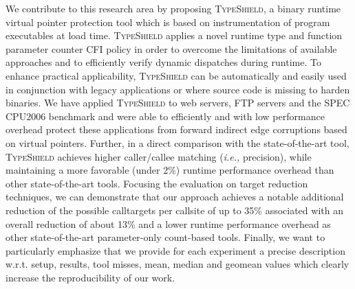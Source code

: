 We contribute to this research area by proposing \textsc{TypeShield}, a binary runtime virtual pointer protection tool 
which is based on instrumentation of program executables at load time. \textsc{TypeShield} applies a novel runtime 
type and function parameter counter CFI policy in order to overcome the limitations of available approaches and to 
efficiently verify dynamic dispatches during runtime. To enhance practical applicability, \textsc{TypeShield} can 
be automatically and easily used in conjunction with legacy applications or where source code is missing to harden 
binaries.
We have applied \textsc{TypeShield} to web servers, FTP servers and the SPEC CPU2006 benchmark and were able to 
efficiently and with low performance overhead protect these applications from forward indirect edge corruptions 
based on virtual pointers. Further, in a direct comparison with the state-of-the-art tool, \textsc{TypeShield} 
achieves higher caller/callee matching (\textit{i.e.,} precision), while maintaining a more favorable (under 2\%) 
runtime performance overhead than other state-of-the-art tools.
Focusing the evaluation on target reduction techniques, we can demonstrate that our approach achieves a notable 
additional reduction of the possible calltargets per callsite of up to 35\% associated with an overall reduction
of about 13\% and a lower runtime performance overhead as other state-of-the-art parameter-only count-based tools.
Finally, we want to particularly emphasize that we provide for each experiment a precise description
w.r.t. setup, results, tool misses, mean, median and geomean values which clearly increase
the reproducibility of our work.